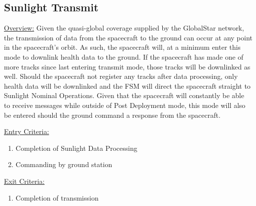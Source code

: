 \documentclass{article}
\begin{document}
\newpage

\subsection{Sunlight Transmit}

\underline{Overview:} Given the quasi-global coverage supplied by the GlobalStar network, the transmission of data from the spacecraft to the ground can occur at any point in the spacecraft's orbit. As such, the spacecraft will, at a minimum enter this mode to downlink health data to the ground. If the spacecraft has made one of more tracks since last entering transmit mode, those tracks will be downlinked as well. Should the spacecraft not register any tracks after data processing, only health data will be downlinked and the FSM will direct the spacecraft straight to Sunlight Nominal Operations. Given that the spacecraft will constantly be able to receive messages while outside of Post Deployment mode, this mode will also be entered should the ground command a response from the spacecraft.

\underline{Entry Criteria:} 

\begin{enumerate}
\item Completion of Sunlight Data Processing
\item Commanding by ground station
\end{enumerate}

\underline{Exit Criteria:}

\begin{enumerate}
\item Completion of transmission
\end{enumerate}
\end{document}
